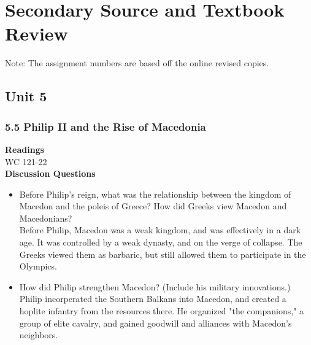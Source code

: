 \documentclass{article}
\begin{document}
\section*{Secondary Source and Textbook Review}
Note: The assignment numbers are based off the online revised copies.
\subsection*{Unit 5}
\subsubsection*{5.5 Philip II and the Rise of Macedonia}
\textbf{Readings} \\
WC 121-22 \\
\textbf{Discussion Questions}
\begin{itemize}
  \item Before Philip’s reign, what was the relationship between the kingdom of Macedon
  and the poleis of Greece? How did Greeks view Macedon and Macedonians? \\
  Before Philip, Macedon was a weak kingdom, and was effectively in a dark age. It was
  controlled by a weak dynasty, and on the verge of collapse. The Greeks viewed them as
  barbaric, but still allowed them to participate in the Olympics.
  \item How did Philip strengthen Macedon?  (Include his military innovations.) \\
  Philip incorperated the Southern Balkans into Macedon, and created a hoplite infantry from
  the resources there. He organized "the companions," a group of elite cavalry, and gained
  goodwill and alliances with Macedon's neighbors.
\end{itemize}
\end{document}

